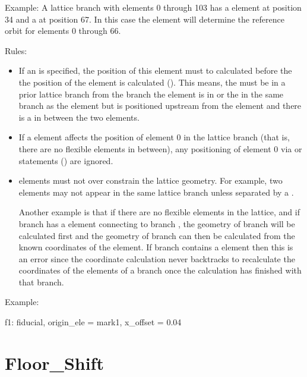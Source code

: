 Example: A lattice branch with elements 0 through 103 has a
 element at position 34 and a   at
position 67. In this case the  element will determine the
reference orbit for elements 0 through 66.

Rules: 
  \begin{itemize}
  \item
If an  is specified, the position of this element must
to calculated before the the position of the  element is
calculated (). This means, the  must be in
a prior lattice branch from the branch the  element is in
or the  in the same branch as the  element
but is positioned upstream from the  element and there is
a   in between the two elements.
  \item
If a  element affects the position of element 0 in the
lattice branch (that is, there are no flexible  elements
in between), any positioning of element 0 via  or
 statements () are ignored.
  \item
{} elements must not over constrain the lattice geometry.
For example, two  elements may not appear in the same
lattice branch unless separated by a  . 

Another example is that if there are no flexible  elements
in the lattice, and if branch  has a  element
connecting to branch , the geometry of branch  will be
calculated first and the geometry of branch  can then be
calculated from the known coordinates of the  element. If
branch  contains a  element then this is an error
since the coordinate calculation never backtracks to recalculate the
coordinates of the elements of a branch once the calculation has
finished with that branch.
  \end{itemize}

Example:
\begin{example}
  f1: fiducial, origin_ele = mark1, x_offset = 0.04
\end{example}

\section{Floor_Shift}
\label{s:floor.ele}

